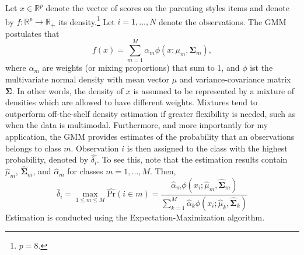 Let $x \in \mathbb{R}^p$ denote the vector of scores on the parenting styles items and denote by $f: \mathbb{R}^p \longrightarrow \mathbb{R}_{+}$ its density.\footnote{
	$p=8$.
} Let $i = 1,\ldots,N$ denote the observations. The GMM postulates that 
\begin{equation}
	f(x) = \sum_{m=1}^{M} \alpha_m \phi(x; \mu_m, \bm{\Sigma}_m),
\end{equation}
where $\alpha_m$ are weights (or mixing proportions) that sum to 1, and $\phi$ ist the multivariate normal density with mean vector $\mu$ and variance-covariance matrix $\bm{\Sigma}$. In other words, the density of $x$ is assumed to be represented by a mixture of densities which are allowed to have different weights. Mixtures tend to outperform off-the-shelf density estimation if greater flexibility is needed, such as when the data is multimodal.
Furthermore, and more importantly for my application, the GMM provides estimates of the probability that an observations belongs to class $m$. Observation $i$ is then assigned to the class with the highest probability, denoted by $\widehat{\delta_i}$. To see this, note that the estimation results contain $\widehat{\mu}_m$, $\widehat{\bm{\Sigma}}_m$, and $\widehat{\alpha}_m$ for classes $m = 1,\ldots, M$. Then,
\begin{equation*}
	\widehat{\delta}_i = \max_{1 \leqslant m \leqslant M} \widehat{\text{Pr}}(i \in m) = \frac{\widehat{\alpha}_m \phi(x_i; \widehat{\mu}_m, \widehat{\bm{\Sigma}}_m)}{\sum_{k=1}^{M} \widehat{\alpha}_k \phi(x_i; \widehat{\mu}_k, \widehat{\bm{\Sigma}}_k)}
\end{equation*}
Estimation is conducted using the Expectation-Maximization algorithm.

